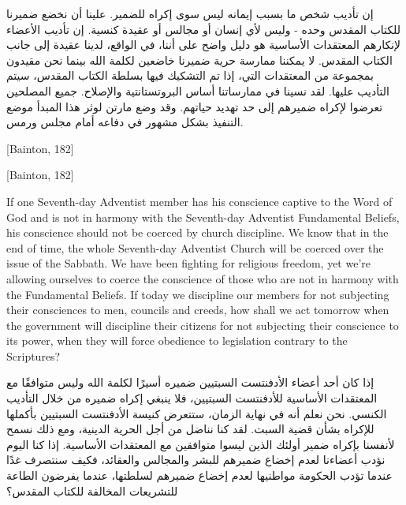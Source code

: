 إن تأديب شخص ما بسبب إيمانه ليس سوى إكراه للضمير. علينا أن نخضع ضميرنا للكتاب المقدس وحده - وليس لأي إنسان أو مجالس أو عقيدة كنسية. إن تأديب الأعضاء لإنكارهم المعتقدات الأساسية هو دليل واضح على أننا، في الواقع، لدينا عقيدة إلى جانب الكتاب المقدس. لا يمكننا ممارسة حرية ضميرنا خاضعين لكلمة الله بينما نحن مقيدون بمجموعة من المعتقدات التي، إذا تم التشكيك فيها بسلطة الكتاب المقدس، سيتم التأديب عليها. لقد نسينا في ممارساتنا أساس البروتستانتية والإصلاح. جميع المصلحين تعرضوا لإكراه ضميرهم إلى حد تهديد حياتهم. وقد وضع مارتن لوثر هذا المبدأ موضع التنفيذ بشكل مشهور في دفاعه أمام مجلس ورمس.


[Bainton, 182]


[Bainton, 182]


If one Seventh-day Adventist member has his conscience captive to the Word of God and is not in harmony with the Seventh-day Adventist Fundamental Beliefs, his conscience should not be coerced by church discipline. We know that in the end of time, the whole Seventh-day Adventist Church will be coerced over the issue of the Sabbath. We have been fighting for religious freedom, yet we’re allowing ourselves to coerce the conscience of those who are not in harmony with the Fundamental Beliefs. If today we discipline our members for not subjecting their consciences to men, councils and creeds, how shall we act tomorrow when the government will discipline their citizens for not subjecting their conscience to its power, when they will force obedience to legislation contrary to the Scriptures?


إذا كان أحد أعضاء الأدفنتست السبتيين ضميره أسيرًا لكلمة الله وليس متوافقًا مع المعتقدات الأساسية للأدفنتست السبتيين، فلا ينبغي إكراه ضميره من خلال التأديب الكنسي. نحن نعلم أنه في نهاية الزمان، ستتعرض كنيسة الأدفنتست السبتيين بأكملها للإكراه بشأن قضية السبت. لقد كنا نناضل من أجل الحرية الدينية، ومع ذلك نسمح لأنفسنا بإكراه ضمير أولئك الذين ليسوا متوافقين مع المعتقدات الأساسية. إذا كنا اليوم نؤدب أعضاءنا لعدم إخضاع ضميرهم للبشر والمجالس والعقائد، فكيف سنتصرف غدًا عندما تؤدب الحكومة مواطنيها لعدم إخضاع ضميرهم لسلطتها، عندما يفرضون الطاعة للتشريعات المخالفة للكتاب المقدس؟


